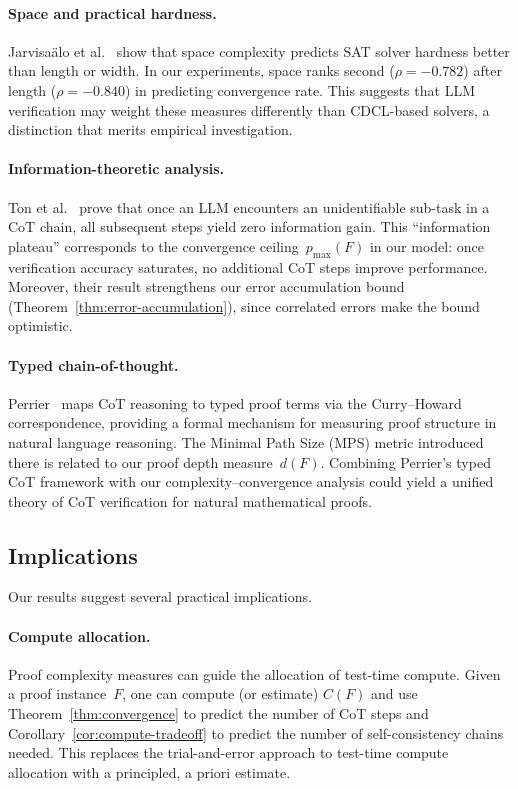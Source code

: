 \paragraph{Space and practical hardness.}
Jarvisa\"alo et al.~\cite{jarvisalo2012relating} show that space complexity
predicts SAT solver hardness better than length or width.  In our experiments,
space ranks second ($\rho = -0.782$) after length ($\rho = -0.840$) in
predicting convergence rate.  This suggests that LLM verification may weight
these measures differently than CDCL-based solvers, a distinction that merits
empirical investigation.

\paragraph{Information-theoretic analysis.}
Ton et al.~\cite{ton2025understanding} prove that once an LLM encounters an
unidentifiable sub-task in a CoT chain, all subsequent steps yield zero
information gain.  This ``information plateau'' corresponds to the convergence
ceiling~$p_{\max}(F)$ in our model: once verification accuracy saturates, no
additional CoT steps improve performance.  Moreover, their result strengthens
our error accumulation bound (Theorem~\ref{thm:error-accumulation}), since
correlated errors make the bound optimistic.

\paragraph{Typed chain-of-thought.}
Perrier~\cite{perrier2025typed} maps CoT reasoning to typed proof terms via the
Curry--Howard correspondence, providing a formal mechanism for measuring proof
structure in natural language reasoning.  The Minimal Path Size (MPS) metric
introduced there is related to our proof depth measure~$d(F)$.  Combining
Perrier's typed CoT framework with our complexity--convergence analysis could
yield a unified theory of CoT verification for natural mathematical proofs.

\subsection{Implications}\label{sec:implications}

Our results suggest several practical implications.

\paragraph{Compute allocation.}
Proof complexity measures can guide the allocation of test-time compute.  Given
a proof instance~$F$, one can compute (or estimate) $C(F)$ and use
Theorem~\ref{thm:convergence} to predict the number of CoT steps and
Corollary~\ref{cor:compute-tradeoff} to predict the number of self-consistency
chains needed.  This replaces the trial-and-error approach to test-time
compute allocation with a principled, a priori estimate.

